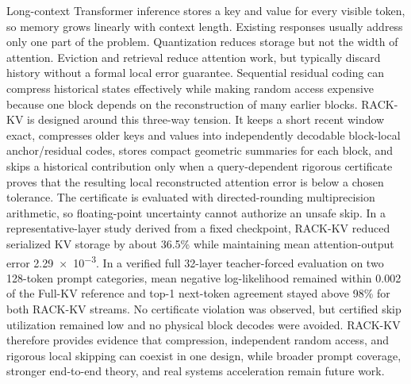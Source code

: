 Long-context Transformer inference stores a key and value for every visible token, so memory grows linearly with context length. Existing responses usually address only one part of the problem. Quantization reduces storage but not the width of attention. Eviction and retrieval reduce attention work, but typically discard history without a formal local error guarantee. Sequential residual coding can compress historical states effectively while making random access expensive because one block depends on the reconstruction of many earlier blocks. RACK-KV is designed around this three-way tension. It keeps a short recent window exact, compresses older keys and values into independently decodable block-local anchor/residual codes, stores compact geometric summaries for each block, and skips a historical contribution only when a query-dependent rigorous certificate proves that the resulting local reconstructed attention error is below a chosen tolerance. The certificate is evaluated with directed-rounding multiprecision arithmetic, so floating-point uncertainty cannot authorize an unsafe skip. In a representative-layer study derived from a fixed \modeldisplay{} checkpoint, RACK-KV reduced serialized KV storage by about \num{36.5}\% while maintaining mean attention-output error \num{2.29e-3}. In a verified full 32-layer teacher-forced evaluation on two 128-token prompt categories, mean negative log-likelihood remained within \num{0.002} of the Full-KV reference and top-1 next-token agreement stayed above \num{98}\% for both RACK-KV streams. No certificate violation was observed, but certified skip utilization remained low and no physical block decodes were avoided. RACK-KV therefore provides evidence that compression, independent random access, and rigorous local skipping can coexist in one design, while broader prompt coverage, stronger end-to-end theory, and real systems acceleration remain future work.
